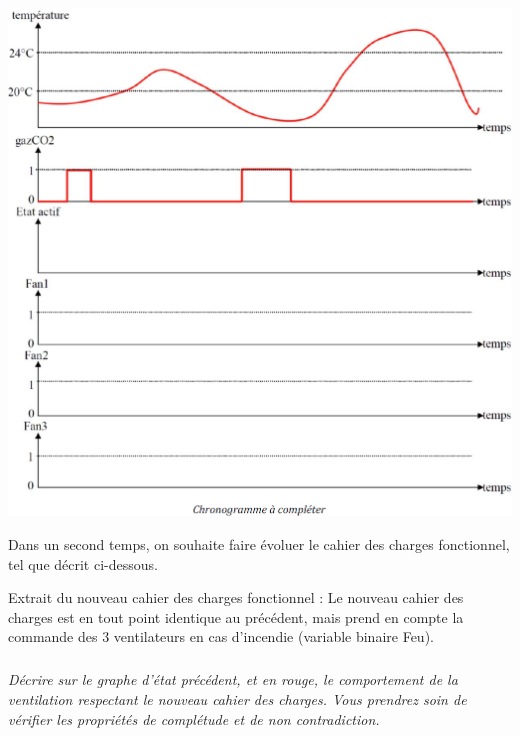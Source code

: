 \documentclass[10pt]{article}
\begin{document}
\begin{center}
\includegraphics[width=.95\textwidth]{images/fig_10}
\end{center}

Dans un second temps, on souhaite faire évoluer le cahier des charges fonctionnel, tel que décrit
ci-dessous.

Extrait du nouveau cahier des charges fonctionnel :
Le nouveau cahier des charges est en tout point identique au précédent, mais prend en compte
la commande des 3 ventilateurs en cas d’incendie (variable binaire Feu).

\subparagraph{}
\textit{Décrire sur le graphe d’état précédent, et en rouge, le comportement de la ventilation
respectant le nouveau cahier des charges. Vous prendrez soin de vérifier les propriétés de
complétude et de non contradiction.}
\end{document}
